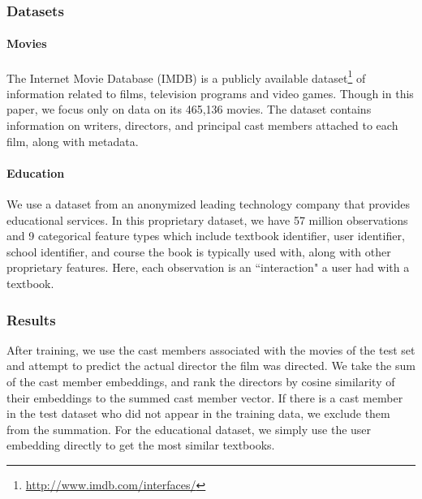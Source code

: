 \documentclass{article}
\begin{document}
\subsubsection{Datasets}

\paragraph{Movies}
The Internet Movie Database (IMDB) is a publicly available dataset\footnote{\href{http://www.imdb.com/interfaces/}{http://www.imdb.com/interfaces/}} of information related to films, television programs and video games.
Though in this paper, we focus only on data on its 465,136 movies.
The dataset contains information on writers, directors, and principal cast members attached to each film, along with  metadata.


\paragraph{Education}
We use a dataset from an anonymized leading technology company that provides educational services.
In this proprietary dataset, we have 57  million observations and 9 categorical feature types which include textbook identifier, user identifier, school identifier, and course the book is typically used with, along with other proprietary features.
Here, each observation is an ``interaction" a user had with a textbook.









\subsubsection{Results}

After training, we use the cast members associated with the movies of the test set and  attempt to predict the actual director the film was directed.
We take the sum of the cast member embeddings, and rank the directors by cosine similarity of their embeddings to the summed cast member vector.
If there is a cast member in the test dataset who did not appear in the training data, we exclude them from the summation.
For the educational dataset, we simply use the user embedding directly to get the most similar textbooks.
\end{document}
